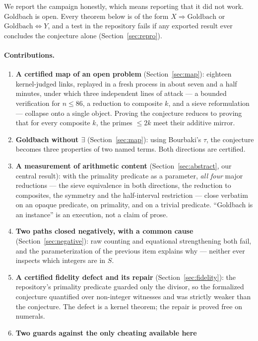 \documentclass[11pt]{article}
\theoremstyle{remark}\newtheorem{remark}{Remark}
\begin{document}
We report the campaign honestly, which means reporting that it did not work. Goldbach
is open. Every theorem below is of the form $X \Rightarrow \mathrm{Goldbach}$ or
$\mathrm{Goldbach} \Leftrightarrow Y$, and a test in the repository fails if any
exported result ever concludes the conjecture alone (Section~\ref{sec:repro}).

\paragraph{Contributions.}
\begin{enumerate}\itemsep2pt
\item \textbf{A certified map of an open problem} (Section~\ref{sec:map}): eighteen
kernel-judged links, replayed in a fresh process in about seven and a half minutes,
under which three independent lines of attack --- a bounded verification for
$n \le 86$, a reduction to composite $k$, and a sieve reformulation --- collapse onto a
single object. Proving the conjecture reduces to proving that for every composite $k$,
the primes $\le 2k$ meet their additive mirror.
\item \textbf{Goldbach without $\exists$} (Section~\ref{sec:map}): using Bourbaki's
$\tau$, the conjecture becomes three properties of two named terms. Both directions are
certified.
\item \textbf{A measurement of arithmetic content} (Section~\ref{sec:abstract}, our
central result): with the primality predicate as a parameter, \emph{all four} major
reductions --- the sieve equivalence in both directions, the reduction to composites,
the symmetry and the half-interval restriction --- close verbatim on an opaque
predicate, on primality, and on a trivial predicate. ``Goldbach is an instance'' is an
execution, not a claim of prose.
\item \textbf{Two paths closed negatively, with a common cause}
(Section~\ref{sec:negative}): raw counting and equational strengthening both fail, and
the parameterization of the previous item explains why --- neither ever inspects which
integers are in $S$.
\item \textbf{A certified fidelity defect and its repair} (Section~\ref{sec:fidelity}):
the repository's primality predicate guarded only the divisor, so the formalized
conjecture quantified over non-integer witnesses and was strictly weaker than the
conjecture. The defect is a kernel theorem; the repair is proved free on numerals.
\item \textbf{Two guards against the only cheating available here}

\end{enumerate}
\end{document}
